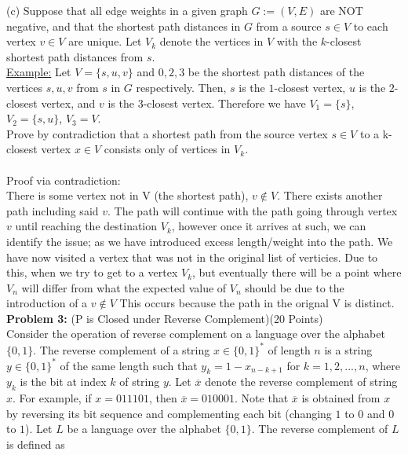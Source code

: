 \documentclass[11pt]{amsart}
\begin{document}
(c) Suppose that all edge weights in a given graph $G:=(V,E)$ are NOT negative, and that the shortest path distances in $G$ from a source $s\in V$ to each vertex $v\in V$ are unique. Let $V_k$ denote the vertices in $V$ with the $k$-closest shortest path distances from $s$.\\

\underline{Example:} Let $V=\{s, u, v\}$ and $0, 2, 3$ be the shortest path distances of the vertices  $s, u, v$ from $s$ in $G$ respectively. Then, $s$ is the $1$-closest vertex, $u$ is the $2$-closest vertex, and $v$ is the $3$-closest vertex. Therefore we have $V_1= \{s\}$, $V_2=\{s,u\}$, $V_3=V$.\\ 

Prove by contradiction that a shortest path from the source vertex $s\in V$ to a k-closest vertex $x\in V$ consists only of vertices in $V_k$. 
\\\\
Proof via contradiction:\\
There is some vertex not in V (the shortest path), $v \notin V$. There exists another path including said $v$. The path will continue with the path going through vertex $v$ until reaching the destination $V_k$, however once it arrives at such, we can identify the issue; as we have introduced excess length/weight into the path. We have now visited a vertex that was not in the original list of verticies. Due to this, when we try to get to a vertex $V_k$, but eventually there will be a point where $V_n$ will differ from what the expected value of $V_n$ should be due to the introduction of a $v \notin V$ This occurs because the path in the orignal V is distinct. 
\newpage
\hrulefill \\
\textbf{Problem 3:} (P is Closed under Reverse Complement)\hfill (20 Points)\\

Consider the operation of reverse complement on a language over the alphabet $\{ 0, 1\}$. The reverse complement of a string $x \in \{ 0, 1 \}^*$ of length $n$ is a string $y \in \{ 0, 1 \}^*$ of the same length such that $y_k = 1 - x_{n-k+1}$ for $k = 1, 2, ..., n$, where $y_k$ is the bit at index $k$ of string $y$. Let $\overline{x}$ denote the reverse complement of string $x$. For example, if $x = 011101$, then $\overline{x} = 010001$. Note that $\overline{x}$ is obtained from  $x$ by reversing its bit sequence
and complementing each bit (changing $1$ to $0$ and $0$ to $1$). Let $L$ be a language over the alphabet $\{ 0, 1\}$. The reverse complement of $L$ is defined as \\
\end{document}
